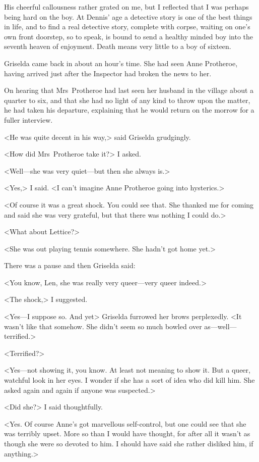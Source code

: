 His cheerful callousness rather grated on me, but I reflected that I was perhaps being hard on the boy. At Dennis' age a detective story is one of the best things in life, and to find a real detective story, complete with corpse, waiting on one's own front doorstep, so to speak, is bound to send a healthy minded boy into the seventh heaven of enjoyment. Death means very little to a boy of sixteen.

Griselda came back in about an hour's time. She had seen Anne Protheroe, having arrived just after the Inspector had broken the news to her.

On hearing that Mrs~Protheroe had last seen her husband in the village about a quarter to six, and that she had no light of any kind to throw upon the matter, he had taken his departure, explaining that he would return on the morrow for a fuller interview.

<He was quite decent in his way,> said Griselda grudgingly.

<How did Mrs~Protheroe take it?> I asked.

<Well—she was very quiet—but then she always is.>

<Yes,> I said. <I can't imagine Anne Protheroe going into hysterics.>

<Of course it was a great shock. You could see that. She thanked me for coming and said she was very grateful, but that there was nothing I could do.>

<What about Lettice?>

<She was out playing tennis somewhere. She hadn't got home yet.>

There was a pause and then Griselda said:

<You know, Len, she was really very queer—very queer indeed.>

<The shock,> I suggested.

<Yes—I suppose so. And yet\longdash> Griselda furrowed her brows perplexedly. <It wasn't like that somehow. She didn't seem so much bowled over as—well—terrified.>

<Terrified?>

<Yes—not showing it, you know. At least not meaning to show it. But a queer, watchful look in her eyes. I wonder if she has a sort of idea who did kill him. She asked again and again if anyone was suspected.>

<Did she?> I said thoughtfully.

<Yes. Of course Anne's got marvellous self-control, but one could see that she was terribly upset. More so than I would have thought, for after all it wasn't as though she were so devoted to him. I should have said she rather disliked him, if anything.>

